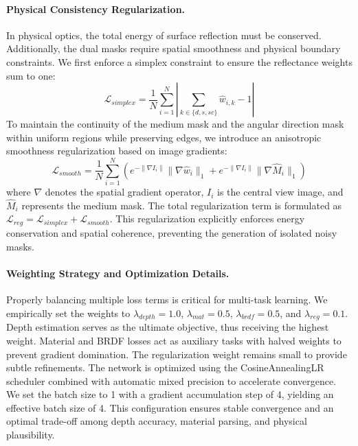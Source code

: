 \paragraph{Physical Consistency Regularization.}
In physical optics, the total energy of surface reflection must be conserved. Additionally, the dual masks require spatial smoothness and physical boundary constraints. We first enforce a simplex constraint to ensure the reflectance weights sum to one:
\begin{equation}
\label{eq:eq32}
\mathcal{L}_{simplex} = \frac{1}{N} \sum_{i=1}^{N} \left| \sum_{k \in \{d, s, sc\}} \hat{w}_{i,k} - 1 \right|
\end{equation}
To maintain the continuity of the medium mask and the angular direction mask within uniform regions while preserving edges, we introduce an anisotropic smoothness regularization based on image gradients:
\begin{equation}
\label{eq:eq33}
\mathcal{L}_{smooth} = \frac{1}{N} \sum_{i=1}^{N} \left( e^{-\|\nabla I_i\|} \|\nabla \hat{w}_i\|_1 + e^{-\|\nabla I_i\|} \|\nabla \hat{M}_i\|_1 \right)
\end{equation}
where $\nabla$ denotes the spatial gradient operator, $I_i$ is the central view image, and $\hat{M}_i$ represents the medium mask. The total regularization term is formulated as $\mathcal{L}_{reg} = \mathcal{L}_{simplex} + \mathcal{L}_{smooth}$. This regularization explicitly enforces energy conservation and spatial coherence, preventing the generation of isolated noisy masks.

\paragraph{Weighting Strategy and Optimization Details.}
Properly balancing multiple loss terms is critical for multi-task learning. We empirically set the weights to $\lambda_{depth} = 1.0$, $\lambda_{mat} = 0.5$, $\lambda_{brdf} = 0.5$, and $\lambda_{reg} = 0.1$. Depth estimation serves as the ultimate objective, thus receiving the highest weight. Material and BRDF losses act as auxiliary tasks with halved weights to prevent gradient domination. The regularization weight remains small to provide subtle refinements. The network is optimized using the CosineAnnealingLR scheduler combined with automatic mixed precision to accelerate convergence. We set the batch size to 1 with a gradient accumulation step of 4, yielding an effective batch size of 4. This configuration ensures stable convergence and an optimal trade-off among depth accuracy, material parsing, and physical plausibility.